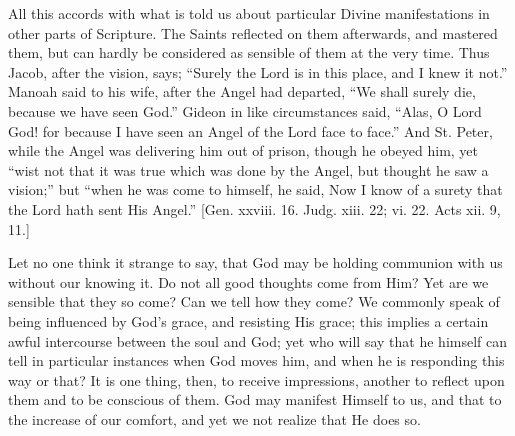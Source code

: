 All this accords with what is told us about particular Divine
manifestations in other parts of Scripture. The Saints reflected on them
afterwards, and mastered them, but can hardly be considered as sensible
of them at the very time. Thus Jacob, after the vision, says;
``Surely the Lord is in this place, and I knew it not.'' Manoah
said to his wife, after the Angel had departed, ``We shall surely
die, because we have seen God.'' Gideon in like circumstances said,
``Alas, O Lord God! for because I have seen an Angel of the Lord
face to face.'' And St. Peter, while the Angel was delivering him
out of prison, though he obeyed him, yet ``wist not that it was true
which was done by the Angel, but thought he saw a vision;'' but
``when he was come to himself, he said, Now I know of a surety that
the Lord hath sent His Angel.'' [Gen. xxviii. 16. Judg. xiii. 22;
vi. 22. Acts xii. 9, 11.]

Let no one think it strange to say, that God may be holding communion
with us without our knowing it. Do not all good thoughts come from Him?
Yet are we sensible that they so come? Can we tell how they come? We
commonly speak of being influenced by God's grace, and resisting His
grace; this implies a certain awful intercourse between the soul and
God; yet who will say that he himself can tell in particular instances
when God moves him, and when he is responding this way or that? It is
one thing, then, to receive impressions, another to reflect upon them
and to be conscious of them. God may manifest Himself to us, and that to
the increase of our comfort, and yet we not realize that He does so.

